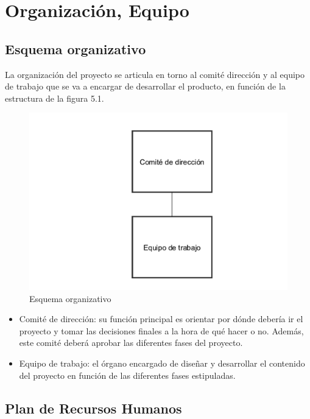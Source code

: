 \chapter{Organización, Equipo}

\section{Esquema organizativo}

La organización del proyecto se articula en torno al comité dirección y al equipo de trabajo que se va a encargar de desarrollar el producto, en función de la estructura de la figura 5.1.

\begin{figure}[!htp]
	\centering
	\includegraphics[scale=.75]{fig/organization}
	\caption{Esquema organizativo}
\end{figure}

\begin{itemize}
	\item Comité de dirección: su función principal es orientar por dónde debería ir el proyecto y tomar las decisiones finales a la hora de qué hacer o no.  Además, este comité deberá aprobar las diferentes fases del proyecto.
	\item Equipo de trabajo: el órgano encargado de diseñar y desarrollar el contenido del proyecto en función de las diferentes fases estipuladas.
\end{itemize}

\section{Plan de Recursos Humanos}
\label{sec:planRecursosHumanos}

